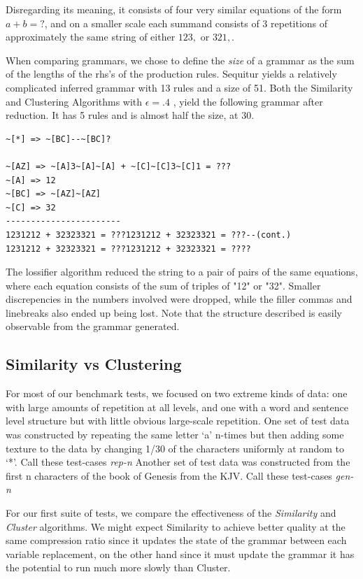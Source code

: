 \documentclass[11pt]{article}
\begin{document}
Disregarding its meaning, it consists of four very similar equations of the
form $a + b = ?$, and on a smaller scale each summand consists of
3 repetitions of approximately the same string of either $123,$ or $321,$.

When comparing grammars, we chose to define the \emph{size} of a grammar
as the sum of the lengths of the rhs's of the production rules.
Sequitur yields a relatively complicated inferred grammar with 13 rules and
a size of 51. Both the Similarity and Clustering Algorithms with $\epsilon = .4$
, yield the following grammar after reduction. It has 5 rules and is almost
half the size, at 30.

\begin{verbatim}
~[*] => ~[BC]--~[BC]?

~[AZ] => ~[A]3~[A]~[A] + ~[C]~[C]3~[C]1 = ???
~[A] => 12
~[BC] => ~[AZ]~[AZ]
~[C] => 32
-----------------------
1231212 + 32323321 = ???1231212 + 32323321 = ???--(cont.)
1231212 + 32323321 = ???1231212 + 32323321 = ????
\end{verbatim}


The lossifier algorithm reduced the string to a pair of
pairs of the same equations, where each equation consists of the
sum of triples of "12" or "32". Smaller discrepencies
in the numbers involved were dropped, while the filler
commas and linebreaks also ended
up being lost. Note that the structure described is easily
observable from the grammar generated.

\subsection{Similarity vs Clustering}
For most of our benchmark tests, we focused on two extreme kinds of data:
one with large amounts of repetition at all levels, and one with a word
and sentence level structure but with little obvious large-scale repetition.
One set of test data was constructed by repeating the same letter `a' n-times
but then adding some
texture to the data by changing 1/30 of the characters uniformly
at random to `*'. Call these test-cases \emph{rep-n}
Another set of test data was constructed from the first n characters of the
book of Genesis from the KJV. Call these test-cases \emph{gen-n}

For our first suite of tests, we compare the effectiveness of the
\emph{Similarity} and \emph{Cluster} algorithms. We might expect
Similarity to achieve better quality at the same compression ratio
since it updates the state of the grammar between each variable
replacement, on the other hand since it must update the grammar
it has the potential to run much more slowly than Cluster.
\end{document}
